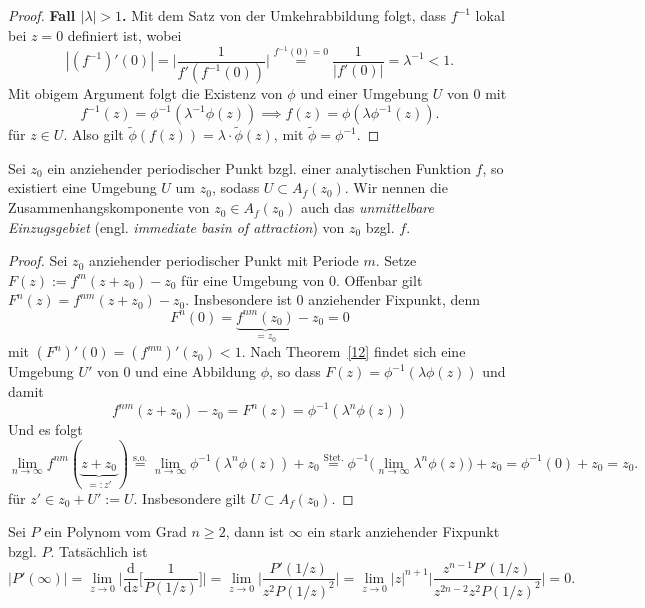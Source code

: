 \documentclass{mywork}
\newcommand{\D}{\mathbb{D}}
\begin{document}
\begin{proof}
\textbf{Fall $|\lambda|>1$.} Mit dem Satz von der Umkehrabbildung folgt, dass $f^{-1}$ lokal bei $z=0$ definiert ist, wobei
\[
|(f^{-1})'(0)|=\Bigg| \frac{1}{f'(f^{-1}(0))}\Bigg|\stackrel{f^{-1}(0)=0}= \frac{1}{|f'(0)|}=\lambda^{-1}<1.
\]
Mit obigem Argument folgt die Existenz von $\phi$ und einer Umgebung $U$ von 0 mit
\[
f^{-1}(z)=\phi^{-1}(\lambda^{-1}\phi(z)) \implies f(z)=\phi(\lambda \phi^{-1}(z)).
\]
für $z\in U$. Also gilt $\tilde \phi (f(z))=\lambda\cdot \tilde \phi(z)$, mit $\tilde \phi=\phi^{-1}$.
\end{proof}

\begin{prop} \label{13}
Sei $z_0$ ein anziehender periodischer Punkt bzgl. einer analytischen Funktion $f$, so existiert eine Umgebung $U$ um $z_0$, sodass $U\subset A_f(z_0)$. Wir nennen die Zusammenhangskomponente von $z_0\in A_f(z_0)$ auch das \emph{unmittelbare Einzugsgebiet} (engl. \emph{immediate basin of attraction}) von $z_0$ bzgl. $f$.
\end{prop}

\begin{proof} 
Sei $z_0$ anziehender periodischer Punkt mit Periode $m$. 
Setze $F(z):=f^m(z+z_0)-z_0$ für eine Umgebung von $0$. Offenbar gilt $F^n(z)=f^{nm}(z+z_0)-z_0$. Insbesondere ist $0$ anziehender Fixpunkt, denn 
\[
F^{n}(0)=\underbrace{f^{nm}(z_0)}_{=z_0}-z_0=0
\] 
mit $(F^{n})'(0)=(f^{mn})'(z_0)<1$. Nach Theorem~\ref{12} findet sich eine Umgebung $U'$ von $0$ und eine Abbildung $\phi$, so dass $F(z)=\phi^{-1}(\lambda\phi(z))$ und damit
\[
	f^{nm}(z+z_0)-z_0=F^n(z)=\phi^{-1}(\lambda^n \phi(z))
\]
Und es folgt
\[
\lim_{n\to \infty} f^{nm}(\underbrace{z+z_0}_{=:z'})\stackrel{\text{s.o.}}= \lim_{n\to \infty} \phi^{-1}(\lambda^n \phi(z))+z_0\stackrel{\text{Stet.}}= \phi^{-1}\Big(\lim_{n\to \infty} \lambda^n \phi(z)\Big)+z_0=\phi^{-1}(0)+z_0=z_0.
\]
für $z'\in z_0+U':=U$. Insbesondere gilt $U\subset A_f(z_0)$.
\end{proof}


\begin{ex}
Sei $P$ ein Polynom vom Grad $n\ge 2$, dann ist $\infty$ ein stark anziehender Fixpunkt bzgl. $P$. Tatsächlich ist 
\[
|P'(\infty)|=\lim_{z\to 0}\Bigg|\frac{\mathrm{d}}{\mathrm{d}z}\Bigg[\frac{1}{P(1/z)}\Bigg]\Bigg|=\lim_{z\to 0}\Bigg|\frac{P'(1/z)}{z^2 P(1/z)^2}\Bigg|=\lim_{z\to 0} |z|^{n+1} \Bigg|\frac{z^{n-1} P'(1/z)}{z^{2n-2}z^2 P(1/z)^2}\Bigg|=0.
\]
\end{ex}
\end{document}
